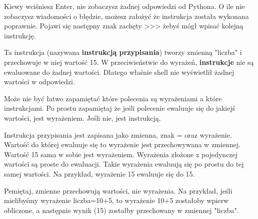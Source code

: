 \documentclass{book}
\begin{document}
Kiewy wciśniesz Enter, nie zobaczysz żadnej odpowiedzi od Pythona. O ile nie zobaczysz wiadomości o błędzie, możesz założyć że instrukcja została wykonana poprawnie. Pojawi się następny znak zachęty >>> żebyś mógł wpisać kolejną instrukcję.

Ta instrukcja (nazywana {\bf instrukcją przypisania}) tworzy zmienną "liczba" i przechowuje w niej wartość 15. W przeciwieństwie do wyrażeń, {\bf instrukcje} nie są ewaluowane do żadnej wartości. Dlatego właśnie shell nie wyświetlił żadnej wartości w odpowiedzi.

Może nie być łatwo zapamiętać które polecenia są wyrażeniami a które instrukcjami. Po prostu zapamiętaj że jeśli polecenie ewaluuje się do jakiejś wartości, jest wyrażeniem. Jeśli nie, jest instrukcją.

Instrukcja przypisania jest zapisana jako zmienna, znak = oraz wyrażenie. Wartość do której ewaluuje się to wyrażenie jest przechowywana w zmiennej. Wartość 15 sama w sobie jest wyrażeniem. Wyrażenia złożone z pojedynczej wartości są proste do ewaluacji. Takie wyrażenia ewaluują się po prostu do tej samej wartości. Na przykład, wyrażenie 15 ewaluuje się do 15.

Pemiętaj, zmienne przechowują wartości, nie wyrażenia. Na przykład, jeśli mielibyśmy wyrażenie liczba=10+5, to wyrażenie 10+5 zostałoby wpierw obliczone, a następnie wynik (15) zostałby przechowany w zmiennej "liczba".
\end{document}
